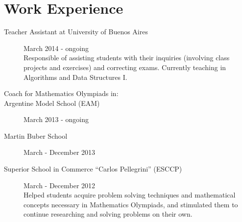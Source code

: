 \documentclass [a4paper, 11pt]{article}
\newcommand{\tabu}{\hspace*{0.7cm}}
\begin{document}
\newpage
\section* {Work Experience}

\begin{description}
  \item[Teacher Assistant at University of Buenos Aires] {\hfill March 2014 - ongoing\\
  Responsible of assisting students with their inquiries (involving class projects and exercises) and correcting exams. Currently teaching in Algorithms and Data Structures I.\\
}

  
\item[Coach for Mathematics Olympiads in:]
\item[\tabu Argentine Model School (EAM)] {\hfill March 2013 - ongoing}
\item[\tabu Martin Buber School] {\hfill March - December 2013}
\item[\tabu Superior School in Commerce ``Carlos Pellegrini'' (ESCCP)] { \hfill March - December 2012 \\

Helped students acquire problem solving techniques and mathematical concepts necessary in Mathematics Olympiads, and stimulated them to continue researching and solving problems on their own.
	}

	

\end{description}
\end{document}
